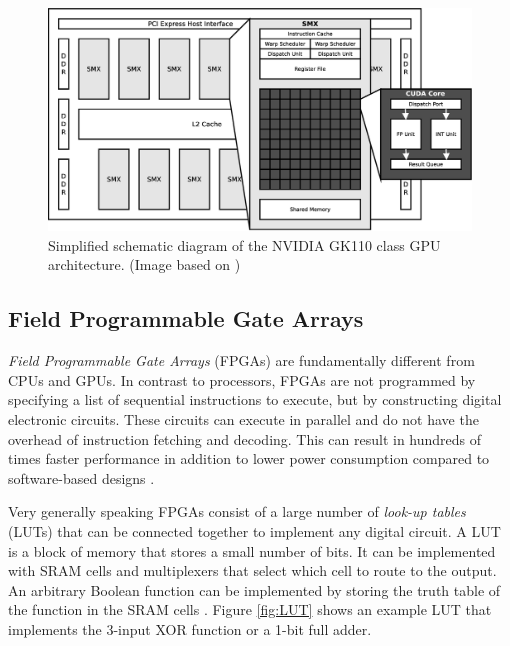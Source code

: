 \begin{figure}[htb]
	  \centerline{
		\includegraphics[width=1.0\textwidth]{images/gpuarch.eps}}
	  \caption{Simplified schematic diagram of the NVIDIA GK110 class GPU architecture. (Image based on \cite{gk110})}
	  \label{fig:gpuarch}
\end{figure}









\subsection{Field Programmable Gate Arrays}



\emph{Field Programmable Gate Arrays} (FPGAs) are fundamentally different from CPUs and GPUs.
In contrast to processors, FPGAs are not programmed by specifying a list of sequential instructions to execute, but by constructing digital electronic circuits.
These circuits can execute in parallel and do not have the overhead of instruction
fetching and decoding.
This can result in hundreds of times faster performance in addition to lower power consumption compared to software-based designs \cite{hauck}.


Very generally speaking FPGAs consist of a large number of \emph{look-up tables} (LUTs) that can be connected together to implement any digital circuit.
A LUT is a block of memory that stores a small number of bits.
It can be implemented with SRAM cells and multiplexers that select which cell to route to the output.
An arbitrary Boolean function can be implemented by storing the truth table of the function in the SRAM cells \cite{hauck}. Figure \ref{fig:LUT} shows an example LUT that implements the 3-input XOR function or a 1-bit full adder.


